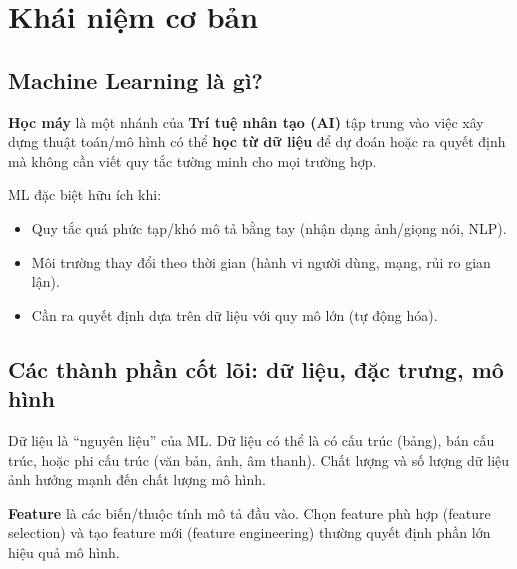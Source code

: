 \section{Khái niệm cơ bản}
\label{sec:khai-niem-nen}

\subsection{Machine Learning là gì?}
\label{sec:ml-la-gi}

\begin{dinhnghia}[title={Machine Learning (ML)}]
\textbf{Học máy} là một nhánh của \textbf{Trí tuệ nhân tạo (AI)} tập trung vào việc xây dựng thuật toán/mô hình có thể \textbf{học từ dữ liệu} để dự đoán hoặc ra quyết định mà không cần viết quy tắc tường minh cho mọi trường hợp.
\end{dinhnghia}

\begin{ynghia}[title={ML giúp giải bài toán nào?}]
ML đặc biệt hữu ích khi:
\begin{itemize}
  \item Quy tắc quá phức tạp/khó mô tả bằng tay (nhận dạng ảnh/giọng nói, NLP).
  \item Môi trường thay đổi theo thời gian (hành vi người dùng, mạng, rủi ro gian lận).
  \item Cần ra quyết định dựa trên dữ liệu với quy mô lớn (tự động hóa).
\end{itemize}
\end{ynghia}

\subsection{Các thành phần cốt lõi: dữ liệu, đặc trưng, mô hình}
\label{sec:thanh-phan-co-lo}

\begin{dinhnghia}[title={Dữ liệu (data)}]
Dữ liệu là ``nguyên liệu'' của ML. Dữ liệu có thể là có cấu trúc (bảng), bán cấu trúc, hoặc phi cấu trúc (văn bản, ảnh, âm thanh).
Chất lượng và số lượng dữ liệu ảnh hưởng mạnh đến chất lượng mô hình.
\end{dinhnghia}

\begin{dinhnghia}[title={Đặc trưng (feature)}]
\textbf{Feature} là các biến/thuộc tính mô tả đầu vào. Chọn feature phù hợp (feature selection) và tạo feature mới (feature engineering) thường quyết định phần lớn hiệu quả mô hình.
\end{dinhnghia}


